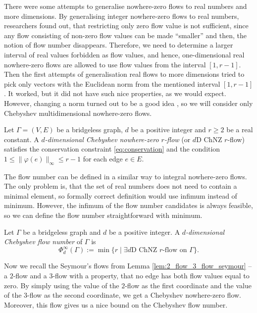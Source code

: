 There were some attempts to generalise nowhere-zero flows to real numbers and more dimensions. By generalising integer nowhere-zero flows to real numbers, researchers found out, that restricting only zero flow value is not sufficient, since any flow consisting of non-zero flow values can be made ``smaller'' and then, the notion of flow number disappears. Therefore, we need to determine a larger interval of real values forbidden as flow values, and hence, one-dimensional real nowhere-zero flows are allowed to use flow values from the interval $[1,r-1]$. Then the first attempts of generalisation real flows to more dimensions tried to pick only vectors with the Euclidean norm from the mentioned interval $[1,r-1]$. It worked, but it did not have such nice properties, as we would expect. However, changing a norm turned out to be a good idea \cite{svk}, so we will consider only Chebyshev multidimensional nowhere-zero flows. 

\begin{definition}
    Let $\Gamma=(V, E)$ be a bridgeless graph, $d$ be a positive integer and $r\geq 2$ be a real constant. A \emph{$d$-dimensional Chebyshev nowhere-zero $r$-flow} (or $d$D ChNZ $r$-flow) satisfies the conservation constraint \eqref{eq:conservation} and the condition $1\leq\|\varphi(e)\|_\infty\leq r-1$ for each edge $e\in E$.
\end{definition}

The flow number can be defined in a similar way to integral nowhere-zero flows. The only problem is, that the set of real numbers does not need to contain a minimal element, so formally correct definition would use infimum instead of minimum. However, the infimum of the flow number candidates is always feasible, so we can define the flow number straightforward with minimum.

\begin{definition}
	Let $\Gamma$ be a bridgeless graph and $d$ be a positive integer. A \emph{$d$-dimensional Chebyshev flow number} of $\Gamma$ is
	\begin{equation*}
		\Phi_d^\infty(\Gamma) := \min\{r\mid\exists d\text{D ChNZ }r\text{-flow on }\Gamma\}.
	\end{equation*}
\end{definition}

Now we recall the Seymour's flows from Lemma \ref{lem:2_flow_3_flow_seymour} -- a $2$-flow and a $3$-flow with a property, that no edge has both flow values equal to zero. By simply using the value of the $2$-flow as the first coordinate and the value of the $3$-flow as the second coordinate, we get a Chebyshev nowhere-zero flow. Moreover, this flow gives us a nice bound on the Chebyshev flow number.

